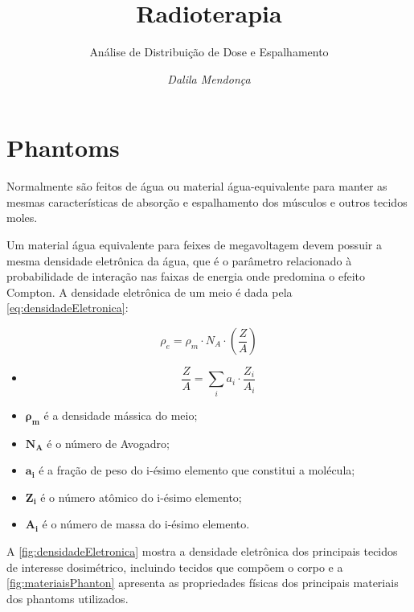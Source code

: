 \documentclass[11pt,a4paper]{article}
\title{Radioterapia}
\author{Análise de Distribuição de Dose e Espalhamento\nocite{*}}
\date{\textit{Dalila Mendonça}}
\newcounter{exemplo}
\begin{document}
	\maketitle

	\section{Phantoms}

	Normalmente são feitos de água ou material água-equivalente para manter as mesmas características de absorção e espalhamento dos músculos e outros tecidos moles.

	Um material água equivalente para feixes de megavoltagem devem possuir a mesma densidade eletrônica da água, que é o parâmetro relacionado à probabilidade de interação nas faixas de energia onde predomina o efeito Compton. A densidade eletrônica de um meio é dada pela \ref{eq:densidadeEletronica}:

		\begin{equation}
			\rho_e = \rho_m \cdot N_A \cdot \left(\frac{Z}{A}\right)
			\label{eq:densidadeEletronica}
		\end{equation}

		\begin{exemplo}[onde:]
			\begin{itemize}
				\item \begin{equation}
							\frac{Z}{A} = \sum_{i} a_i \cdot \frac{Z_i}{A_i}
					\end{equation}
		\item \textcolor{CarnationPink}{$\mathbf{\rho_m}$} é a densidade mássica do meio;
		\item \textcolor{CarnationPink}{$\mathbf{N_A}$} é o número de Avogadro;
		\item \textcolor{CarnationPink}{$\mathbf{a_i}$} é a fração de peso do i-ésimo elemento que constitui a molécula;
		\item \textcolor{CarnationPink}{$\mathbf{Z_i}$} é o número atômico do i-ésimo elemento;
		\item \textcolor{CarnationPink}{$\mathbf{A_i}$} é o número de massa do i-ésimo elemento.
			  \end{itemize}
		\end{exemplo}

	A \ref{fig:densidadeEletronica} mostra a densidade eletrônica dos principais tecidos de interesse dosimétrico, incluindo tecidos que compõem o corpo e a \ref{fig:materiaisPhanton} apresenta as propriedades físicas dos principais materiais dos phantoms utilizados.
\end{document}
